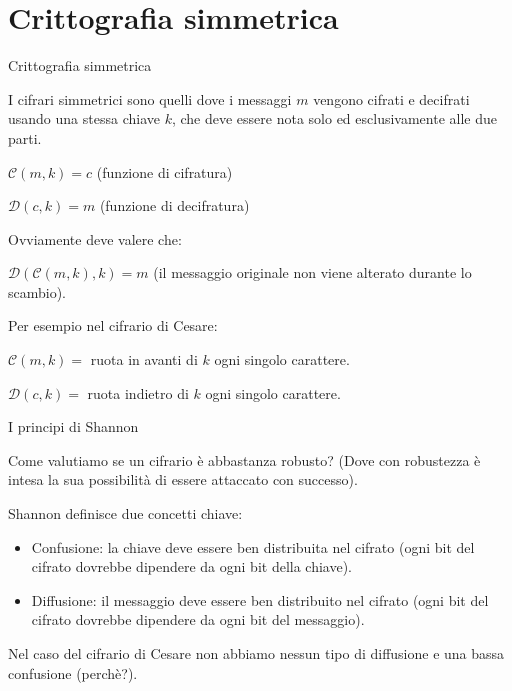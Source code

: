 \documentclass[xcolor=dvipsnames,aspectratio=169]{beamer}
\begin{document}
\part{Crittografia simmetrica}

\begin{frame}
	\partpage
	\centering
\end{frame}

\begin{frame}{Crittografia simmetrica}

  \pause

  I cifrari simmetrici sono quelli dove i messaggi $m$ vengono cifrati e decifrati usando una stessa chiave $k$, che deve essere nota solo ed esclusivamente alle due parti.
  
  \medskip

  \pause
  $\mathcal{C}(m, k) = c$ (funzione di cifratura)
    
  $\mathcal{D}(c, k) = m$ (funzione di decifratura)
  
  \medskip

  Ovviamente deve valere che:
  
  $\mathcal{D}(\mathcal{C}(m, k), k) = m$ (il messaggio originale non viene alterato durante lo scambio).
  
  \medskip
  \pause
  
  Per esempio nel cifrario di Cesare:
  
  $\mathcal{C}(m, k) = $ ruota in avanti di $k$ ogni singolo carattere.
  
  $\mathcal{D}(c, k) = $ ruota indietro di $k$ ogni singolo carattere.
  
\end{frame}

\begin{frame}{I principi di Shannon}

  \pause
  Come valutiamo se un cifrario è abbastanza robusto? (Dove con robustezza è intesa la sua possibilità di essere attaccato con successo). 
  
  \medskip
  \pause
  Shannon definisce due concetti chiave:
  
  \begin{itemize}
    \item Confusione: la chiave deve essere ben distribuita nel cifrato (ogni bit del cifrato dovrebbe dipendere da ogni bit della chiave).
    \item Diffusione: il messaggio deve essere ben distribuito nel cifrato (ogni bit del cifrato dovrebbe dipendere da ogni bit del messaggio).
  \end{itemize}
  
  \medskip
  \pause
  
  Nel caso del cifrario di Cesare non abbiamo nessun tipo di diffusione e una bassa confusione (perchè?).
  
\end{frame}
\end{document}
